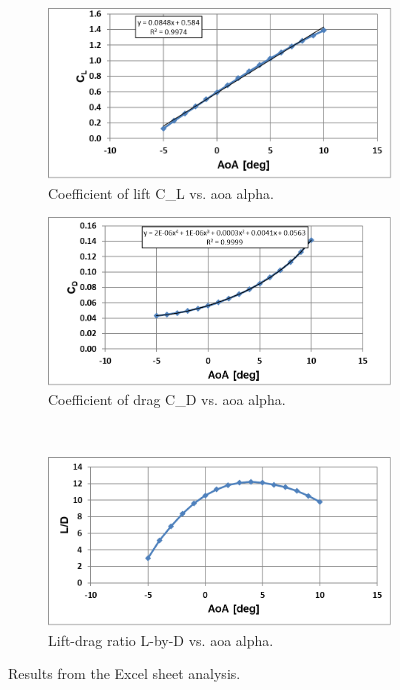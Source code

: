\begin{figure}[htpb]
    \centering
    \begin{subfigure}{0.49\textwidth}
        \centering
        \includegraphics[width=\textwidth]{Figures/cl_vs_aoa.png}
        \caption{Coefficient of lift \gls{C_L} vs. \acrshort{aoa} \gls{alpha}.}
        \label{fig:cl_vs_aoa}
    \end{subfigure}
    \begin{subfigure}{0.49\textwidth}
        \centering
        \includegraphics[width=\textwidth]{Figures/cd_vs_aoa.png}
        \caption{Coefficient of drag \gls{C_D} vs. \acrshort{aoa} \gls{alpha}.}
        \label{fig:cd_vs_aoa}
    \end{subfigure} \\
    \begin{subfigure}{0.49\textwidth}
        \centering
        \includegraphics[width=\textwidth]{Figures/ld_vs_aoa.png}
        \caption{Lift-drag ratio \gls{L-by-D} vs. \acrshort{aoa} \gls{alpha}.}
        \label{fig:ld_vs_aoa}
    \end{subfigure}
    \caption[Performance curves from Excel]{Results from the Excel sheet analysis.}
    \label{fig:excel_results}
\end{figure}

